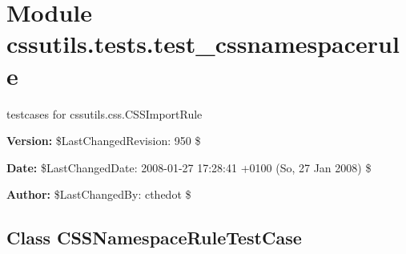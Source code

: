 %
%
%


\section{Module cssutils.tests.test\_cssnamespacerule}

    \label{cssutils:tests:test_cssnamespacerule}
testcases for cssutils.css.CSSImportRule

\textbf{Version:} \$LastChangedRevision: 950 \$



\textbf{Date:} \$LastChangedDate: 2008-01-27 17:28:41 +0100 (So, 27 Jan 2008) \$



\textbf{Author:} \$LastChangedBy: cthedot \$





\subsection{Class CSSNamespaceRuleTestCase}

